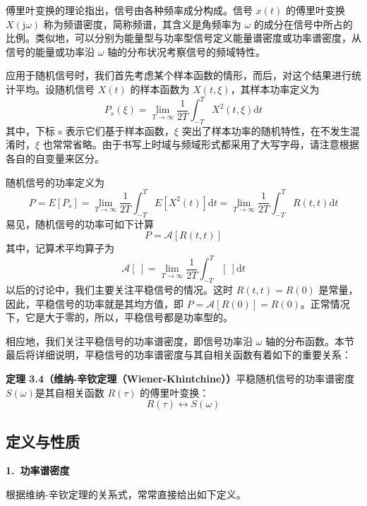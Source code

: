 \documentclass[11pt,openany,UTF8]{ctexbook}
\newcommand{\dif}{\mathrm{d}}                      %
\newcommand{\ju}{\mathrm{j}}                       %
\newcommand{\E}{E}                                 %
\newcommand{\Acal}{\mathcal{A}}                    %
\newcommand{\bhead}[1]{\par\medskip\noindent\textbf{#1}\par\smallskip}
\newcommand{\thm}[1]{\par\medskip\noindent\textbf{#1}\quad}
\newcommand{\fw}[1]{{\xeCJKsetup{CJKecglue={}}（#1\nobreak）}}
\begin{document}
傅里叶变换的理论指出\nobreak，信号由各种频率成分构成\nobreak。信号 $x(t)$ 的傅里叶变换 $X(\ju\omega)$ 称为频谱密度\nobreak，简称频谱\nobreak，其含义是角频率为 $\omega$ 的成分在信号中所占的比例\nobreak。类似地\nobreak，可以分别为能量型与功率型信号定义能量谱密度或功率谱密度\nobreak，从信号的能量或功率沿 $\omega$ 轴的分布状况考察信号的频域特性\nobreak。

应用于随机信号时\nobreak，我们首先考虑某个样本函数的情形\nobreak，而后\nobreak，对这个结果进行统计平均\nobreak。设随机信号 $X(t)$ 的样本函数为 $X(t,\xi)$\nobreak，其样本功率定义为
\begin{equation}
P_s(\xi)=\lim_{T\to\infty}\frac{1}{2T}\int_{-T}^{T}X^2(t,\xi)\dif t
\label{eq:3.13}
\end{equation}
其中\nobreak，下标 s 表示它们基于样本函数\nobreak，$\xi$ 突出了样本功率的随机特性\nobreak，在不发生混淆时\nobreak，$\xi$ 也常常省略\nobreak。由于书写上时域与频域形式都采用了大写字母\nobreak，请注意根据各自的自变量来区分\nobreak。

随机信号的功率定义为
\begin{equation}
P=\E[P_s]=\lim_{T\to\infty}\frac{1}{2T}\int_{-T}^{T}\E[X^2(t)]\dif t=\lim_{T\to\infty}\frac{1}{2T}\int_{-T}^{T}R(t,t)\dif t
\label{eq:3.14}
\end{equation}
易见\nobreak，随机信号的功率可如下计算
\[
P=\Acal[R(t,t)]
\]
其中\nobreak，记算术平均算子为
\begin{equation}
\Acal[\ ]=\lim_{T\to\infty}\frac{1}{2T}\int_{-T}^{T}[\ ]\dif t
\label{eq:3.15}
\end{equation}
以后的讨论中\nobreak，我们主要关注平稳信号的情况\nobreak。这时 $R(t,t)=R(0)$ 是常量\nobreak，因此\nobreak，平稳信号的功率就是其均方值\nobreak，即 $P=\Acal[R(0)]=R(0)$\nobreak。正常情况下\nobreak，它是大于零的\nobreak，所以\nobreak，平稳信号都是功率型的\nobreak。

相应地\nobreak，我们关注平稳信号的功率谱密度\nobreak，即信号功率沿 $\omega$ 轴的分布函数\nobreak。本节最后将详细说明\nobreak，平稳信号的功率谱密度与其自相关函数有着如下的重要关系\nobreak：

\thm{定理 3.4（维纳-辛钦定理\fw{Wiener-Khintchine}\nobreak）}平稳随机信号的功率谱密度 $S(\omega)$是其自相关函数 $R(\tau)$ 的傅里叶变换\nobreak：
\begin{equation}
R(\tau)\leftrightarrow S(\omega)
\label{eq:3.16}
\end{equation}

\subsection{定义与性质}
\bhead{1.\ 功率谱密度}
根据维纳-辛钦定理的关系式\nobreak，常常直接给出如下定义\nobreak。
\end{document}

